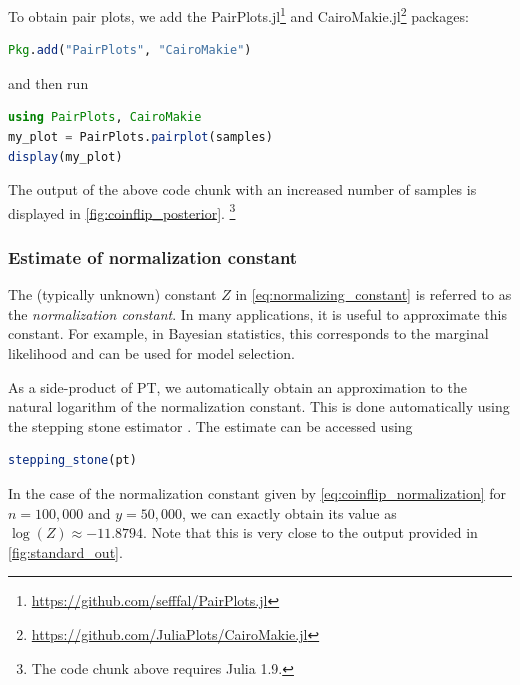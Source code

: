  
To obtain pair plots, we add the 
PairPlots.jl\footnote{\url{https://github.com/sefffal/PairPlots.jl}}
and CairoMakie.jl\footnote{\url{https://github.com/JuliaPlots/CairoMakie.jl}}
packages:
\begin{lstlisting}[language=Julia]
Pkg.add("PairPlots", "CairoMakie")
\end{lstlisting}
and then run
\begin{lstlisting}[language=Julia]
using PairPlots, CairoMakie
my_plot = PairPlots.pairplot(samples) 
display(my_plot)
\end{lstlisting}
The output of the above code chunk with an increased number of samples 
is displayed in \cref{fig:coinflip_posterior}.
\footnote{The code chunk above requires Julia 1.9.}


\subsubsection{Estimate of normalization constant}
The (typically unknown) constant $Z$ in \cref{eq:normalizing_constant} is 
referred to as the \emph{normalization constant}. 
In many applications, it is useful to approximate this constant. 
For example, in Bayesian statistics, this corresponds to the 
marginal likelihood and can be used for model selection. 

 
As a side-product of PT, we automatically obtain an approximation to the natural 
logarithm of the normalization constant. This is done automatically using the 
stepping stone estimator \cite{xie2011improving}.
The estimate can be accessed using
\begin{lstlisting}[language=Julia]
stepping_stone(pt)
\end{lstlisting}
In the case of the normalization constant given by \cref{eq:coinflip_normalization} 
for $n=100,000$ and $y=50,000$, we can exactly obtain its value as $\log(Z) \approx -11.8794$.
Note that this is very close to the output provided in \cref{fig:standard_out}.


